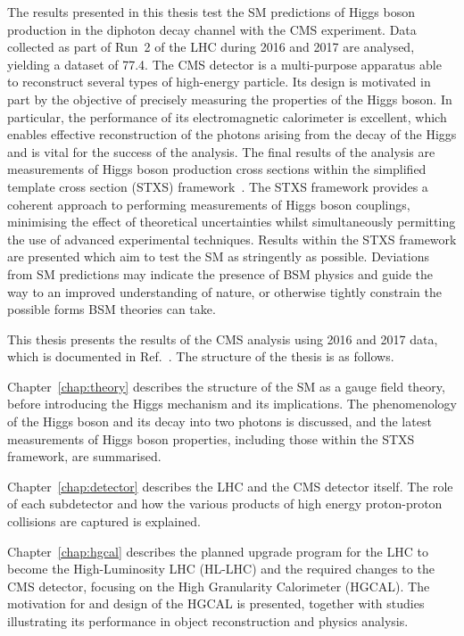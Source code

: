 The results presented in this thesis test the SM predictions of Higgs boson production
in the diphoton decay channel with the CMS experiment.
Data collected as part of Run~2 of the LHC during 2016 and 2017 are analysed, 
yielding a dataset of \SI{77.4}{\fbinv}.
The CMS detector is a multi-purpose apparatus able to reconstruct several types of high-energy particle.
Its design is motivated in part by the objective of precisely measuring the properties of the Higgs boson.
In particular, the performance of its electromagnetic calorimeter is excellent, 
which enables effective reconstruction of the photons arising from the decay of the Higgs 
and is vital for the success of the \Hgg analysis.
The final results of the analysis are measurements of Higgs boson production cross sections
within the simplified template cross section (STXS) framework~\cite{YR4}.
The STXS framework provides a coherent approach to performing measurements of Higgs boson couplings, 
minimising the effect of theoretical uncertainties 
whilst simultaneously permitting the use of advanced experimental techniques.
Results within the STXS framework are presented
which aim to test the SM as stringently as possible.
Deviations from SM predictions may indicate the presence of BSM physics 
and guide the way to an improved understanding of nature, 
or otherwise tightly constrain the possible forms BSM theories can take.

This thesis presents the results of the CMS \Hgg analysis using 2016 and 2017 data, 
which is documented in Ref.~\cite{HIG-18-029}.
The structure of the thesis is as follows.

Chapter~\ref{chap:theory} describes the structure of the SM as a gauge field theory, 
before introducing the Higgs mechanism and its implications.
The phenomenology of the Higgs boson and its decay into two photons is discussed, 
and the latest measurements of Higgs boson properties, including those within the STXS framework, 
are summarised.

Chapter~\ref{chap:detector} describes the LHC and the CMS detector itself.
The role of each subdetector and how the various products 
of high energy proton-proton collisions are captured is explained.

Chapter~\ref{chap:hgcal} describes the planned upgrade program for the LHC to become the High-Luminosity LHC (HL-LHC) 
and the required changes to the CMS detector, focusing on the High Granularity Calorimeter (HGCAL).
The motivation for and design of the HGCAL is presented, 
together with studies illustrating its performance in object reconstruction and physics analysis.

